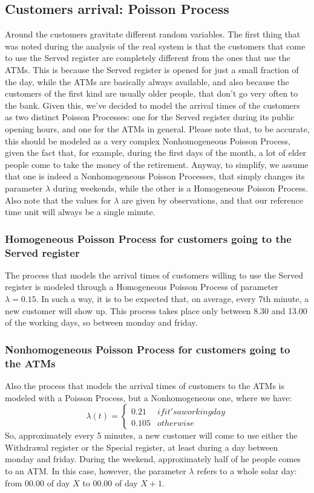 \documentclass{article}
\begin{document}
\subsection{Customers arrival: Poisson Process}
Around the customers gravitate different random variables. The first thing that was noted during the analysis of the real system is that the customers that come to use the Served register are completely different from the ones that use the ATMs. This is because the Served register is opened for just a small fraction of the day, while the ATMs are basically always available, and also because the customers of the first kind are usually older people, that don't go very often to the bank. Given this, we've decided to model the arrival times of the customers as two distinct Poisson Processes: one for the Served register during its public opening hours, and one for the ATMs in general. Please note that, to be accurate, this should be modeled as a very complex Nonhomogeneous Poisson Process, given the fact that, for example, during the first days of the month, a lot of elder people come to take the money of the retirement. Anyway, to simplify, we assume that one is indeed a Nonhomogeneous Poisson Processes, that simply changes its parameter $\lambda$ during weekends, while the other is a Homogeneous Poisson Process. Also note that the values for $\lambda$ are given by observations, and that our reference time unit will always be a single minute.
\subsubsection{Homogeneous Poisson Process for customers going to the Served register}
The process that models the arrival times of customers willing to use the Served register is modeled through a Homogeneous Poisson Process of parameter $\lambda = 0.15$. In such a way, it is to be expected that, on average, every 7th minute, a new customer will show up. This process takes place only between 8.30 and 13.00 of the working days, so between monday and friday.
\subsubsection{Nonhomogeneous Poisson Process for customers going to the ATMs} \label{nonhomogeneus_atm}
Also the process that models the arrival times of customers to the ATMs is modeled with a Poisson Process, but a Nonhomogeneous one, where we have:
 \begin{equation*}
    \lambda(t) =
    \begin{cases*}
      \text{0.21} & if it's a working day \\
      \text{0.105} & otherwise   
    \end{cases*}
  \end{equation*}
So, approximately every 5 minutes, a new customer will come to use either the Withdrawal register or the Special register, at least during a day between monday and friday. During the weekend, approximately half of he people comes to an ATM. In this case, however, the parameter $\lambda$ refers to a whole solar day: from 00.00 of day $X$ to 00.00 of day $X+1$.
\end{document}
